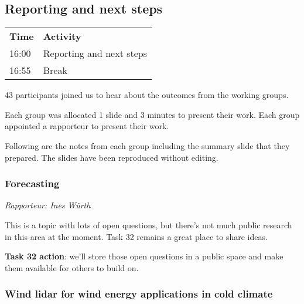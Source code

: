 \subsection{Reporting and next steps}
\label{sec:reporting}

\begin{table}[!h]
    \centering
    \begin{tabular}{@{}
        |p{}
        |p{}
        |@{}}
    \rowcolor{Task32Blue2} \textbf{Time} & \textbf{Activity} \\    
    16:00 & Reporting and next steps \\
    16:55 & Break
    \end{tabular}
    \label{tab:day4-results-agenda}
\end{table}

43 participants joined us to hear about the outcomes from the working groups.

Each group was allocated 1 slide and 3 minutes to present their work. Each group appointed a rapporteur to present their work.

Following are the notes from each group including the summary slide that they prepared. The slides have been reproduced without editing.

\subsubsection{Forecasting}

\emph{Rapporteur: Ines Würth}

This is a topic with lots of open questions, but there's not much public research in this area at the moment. Task 32 remains a great place to share ideas. %

\begin{taskactions}
\textbf{Task 32 action}: we'll store those open questions in a public space and make them available for others to build on.
\end{taskactions}

\subsubsection{Wind lidar for wind energy applications in cold climate}

